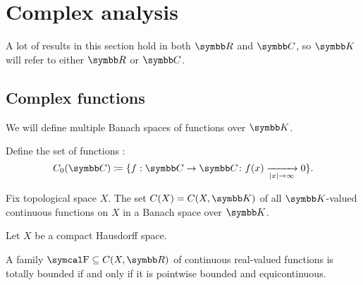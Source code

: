 \section{Complex analysis}\label{sec:complex_analysis}

A lot of results in this section hold in both \( \R \) and \( \C \), so \( \K \) will refer to either \( \R \) or \( \C \).

\subsection{Complex functions}\label{subsec:complex_functions}

\begin{definition}\label{def:function_spaces}
  We will define multiple Banach spaces of functions over \( \K \).

  \begin{defenum}
     Define the set of functions :
    \begin{equation*}
      C_0(\C) \coloneqq \{ f: \C \to \C \colon f(x) \xrightarrow[\Abs{x} \to \infty]{} 0 \}.
    \end{equation*}

     Fix topological space \( X \). The set \( C(X) = C(X, \K) \) of all \( \K \)-valued continuous functions on \( X \) in a Banach space over \( \K \).
  \end{defenum}
\end{definition}

\begin{theorem}\label{thm:arzela_ascoli}\cite[corollary 10.49]{Knapp2016BAlg}
  Let \( X \) be a compact Hausdorff space.

  A family \( \F \subseteq C(X, \R) \) of continuous real-valued functions is totally bounded if and only if it is pointwise bounded and equicontinuous.
\end{theorem}
